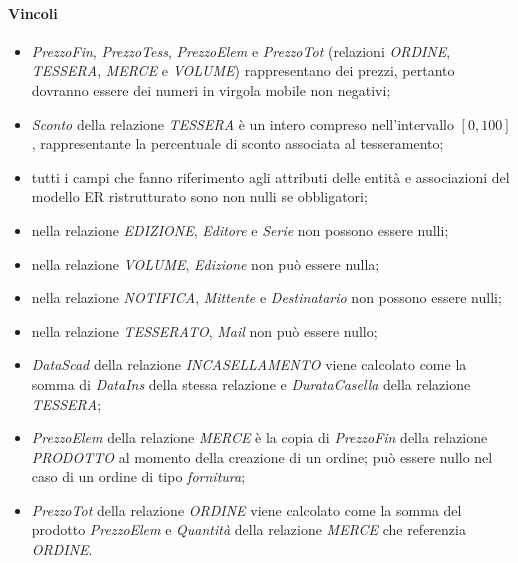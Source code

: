 \documentclass[a4paper]{scrartcl}
\begin{document}
\begin{footnotesize}
\paragraph*{Vincoli}
\begin{itemize}
\item \textit{PrezzoFin}, \textit{PrezzoTess}, \textit{PrezzoElem} e \textit{PrezzoTot} (relazioni \textit{ORDINE}, \textit{TESSERA}, \textit{MERCE} e \textit{VOLUME}) rappresentano dei prezzi, pertanto dovranno essere dei numeri in virgola mobile non negativi;
\item \textit{Sconto} della relazione \textit{TESSERA} è un intero compreso nell'intervallo $[0,100]$, rappresentante la percentuale di sconto associata al tesseramento;
\item tutti i campi che fanno riferimento agli attributi delle entità e associazioni del modello ER ristrutturato sono non nulli se obbligatori;
\item nella relazione \textit{EDIZIONE}, \textit{Editore} e \textit{Serie} non possono essere nulli;
\item nella relazione \textit{VOLUME}, \textit{Edizione} non può essere nulla;
\item nella relazione \textit{NOTIFICA}, \textit{Mittente} e \textit{Destinatario} non possono essere nulli;
\item nella relazione \textit{TESSERATO}, \textit{Mail} non può essere nullo;
\item \textit{DataScad} della relazione \textit{INCASELLAMENTO} viene calcolato come la somma di \textit{DataIns} della stessa relazione e \textit{DurataCasella} della relazione \textit{TESSERA};
\item \textit{PrezzoElem} della relazione \textit{MERCE} è la copia di \textit{PrezzoFin} della relazione \textit{PRODOTTO} al momento della creazione di un ordine; può essere nullo nel caso di un ordine di tipo \textit{fornitura};
\item \textit{PrezzoTot} della relazione \textit{ORDINE} viene calcolato come la somma del prodotto \textit{PrezzoElem} e \textit{Quantità} della relazione \textit{MERCE} che referenzia \textit{ORDINE}.
\end{itemize}

\end{footnotesize}
\end{document}
